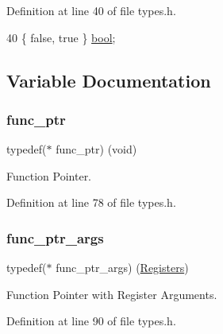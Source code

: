 Definition at line 40 of file types.\+h.


\begin{DoxyCode}
40 \{ \textcolor{keyword}{false}, \textcolor{keyword}{true} \} \hyperlink{a00125_af6a258d8f3ee5206d682d799316314b1_af6a258d8f3ee5206d682d799316314b1}{bool};
\end{DoxyCode}


\subsection{Variable Documentation}
\mbox{\label{a00125_a5e730b1100d491afc6fa17d12fcd15a8_a5e730b1100d491afc6fa17d12fcd15a8}} 
\subsubsection{\texorpdfstring{func\+\_\+ptr}{func\_ptr}}
{\footnotesize\ttfamily typedef($\ast$ func\+\_\+ptr) (void)}



Function Pointer. 



Definition at line 78 of file types.\+h.

\mbox{\label{a00125_a7ec4af7c086c1f2c2a0e01fc23203a56_a7ec4af7c086c1f2c2a0e01fc23203a56}} 
\subsubsection{\texorpdfstring{func\+\_\+ptr\+\_\+args}{func\_ptr\_args}}
{\footnotesize\ttfamily typedef($\ast$ func\+\_\+ptr\+\_\+args) (\hyperlink{a00234}{Registers})}



Function Pointer with Register Arguments. 



Definition at line 90 of file types.\+h.

